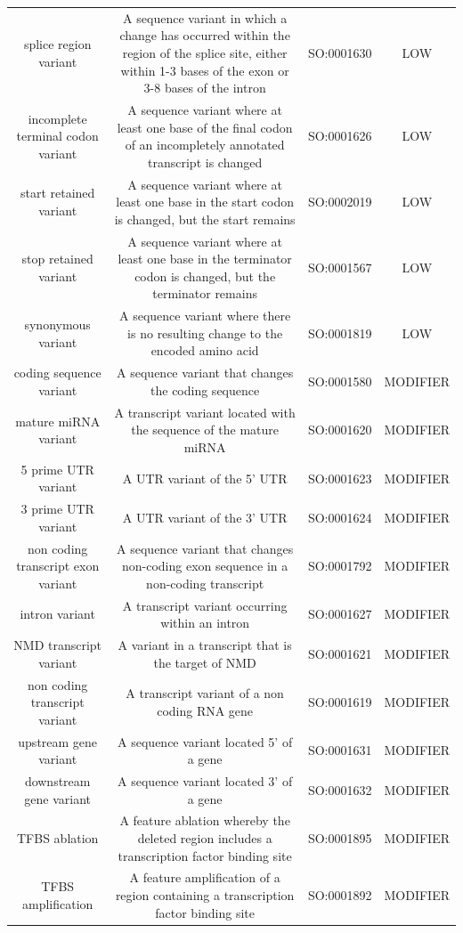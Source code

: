 {\begin{table}
\begin{adjustbox}{width=1\textwidth}
\begin{tabular}{c c c c}
splice region variant & A sequence variant in which a change has occurred within the region of the splice site, either within 1-3 bases of the exon or 3-8 bases of the intron & SO:0001630 & LOW \\
incomplete terminal codon variant & A sequence variant where at least one base of the final codon of an incompletely annotated transcript is changed & SO:0001626 & LOW \\
start retained variant & A sequence variant where at least one base in the start codon is changed, but the start remains & SO:0002019 & LOW \\
stop retained variant & A sequence variant where at least one base in the terminator codon is changed, but the terminator remains & SO:0001567 & LOW \\
synonymous variant & A sequence variant where there is no resulting change to the encoded amino acid & SO:0001819 & LOW \\
coding sequence variant & A sequence variant that changes the coding sequence & SO:0001580 & MODIFIER \\
mature miRNA variant & A transcript variant located with the sequence of the mature miRNA & SO:0001620 & MODIFIER \\
5 prime UTR variant & A UTR variant of the 5' UTR & SO:0001623 & MODIFIER \\
3 prime UTR variant & A UTR variant of the 3' UTR & SO:0001624 & MODIFIER \\
non coding transcript exon variant & A sequence variant that changes non-coding exon sequence in a non-coding transcript & SO:0001792 & MODIFIER \\
intron variant & A transcript variant occurring within an intron & SO:0001627 & MODIFIER \\
NMD transcript variant & A variant in a transcript that is the target of NMD & SO:0001621 & MODIFIER \\
non coding transcript variant & A transcript variant of a non coding RNA gene & SO:0001619 & MODIFIER \\
upstream gene variant & A sequence variant located 5' of a gene & SO:0001631 & MODIFIER \\
downstream gene variant & A sequence variant located 3' of a gene & SO:0001632 & MODIFIER \\
TFBS ablation & A feature ablation whereby the deleted region includes a transcription factor binding site & SO:0001895 & MODIFIER \\
TFBS amplification & A feature amplification of a region containing a transcription factor binding site & SO:0001892 & MODIFIER \\

\end{tabular}
\end{adjustbox}
\end{table}}
